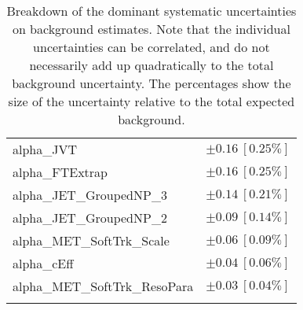 \begin{table}
\begin{center}
\begin{tabular*}{\textwidth}{@{\extracolsep{\fill}}lc}
alpha\_JVT         & $\pm 0.16\ [0.25\%] $       \\
alpha\_FTExtrap         & $\pm 0.16\ [0.25\%] $       \\
alpha\_JET\_GroupedNP\_3         & $\pm 0.14\ [0.21\%] $       \\
alpha\_JET\_GroupedNP\_2         & $\pm 0.09\ [0.14\%] $       \\
alpha\_MET\_SoftTrk\_Scale         & $\pm 0.06\ [0.09\%] $       \\
alpha\_cEff         & $\pm 0.04\ [0.06\%] $       \\
alpha\_MET\_SoftTrk\_ResoPara         & $\pm 0.03\ [0.04\%] $       \\
\noalign{\smallskip}\hline\noalign{\smallskip}
\end{tabular*}
\end{center}
\caption[Breakdown of uncertainty on background estimates]{
Breakdown of the dominant systematic uncertainties on background estimates.
Note that the individual uncertainties can be correlated, and do not necessarily add up quadratically to 
the total background uncertainty. The percentages show the size of the uncertainty relative to the total expected background.
\label{table.results.bkgestimate.uncertainties.VRTopAT0}}
\end{table}
%
